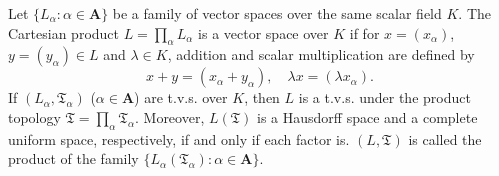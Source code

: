 Let $\{L_\alpha : \alpha \in \mathbf{A}\}$ be a family of vector spaces over the same scalar field $K$. The Cartesian product $L = \prod_\alpha L_\alpha$ is a vector space over $K$ if for $x = (x_\alpha)$, $y = (y_\alpha) \in L$ and $\lambda \in K$, addition and scalar multiplication are defined by
$$x + y = (x_\alpha + y_\alpha), \quad \lambda x = (\lambda x_\alpha).$$
If $(L_\alpha, \mathfrak{T}_\alpha)$ ($\alpha \in \mathbf{A}$) are t.v.s. over $K$, then $L$ is a t.v.s. under the product topology $\mathfrak{T} = \prod_\alpha \mathfrak{T}_\alpha$. Moreover, $L(\mathfrak{T})$ is a Hausdorff space and a complete uniform space, respectively, if and only if each factor is. $(L, \mathfrak{T})$ is called the product of the family $\{L_\alpha(\mathfrak{T}_\alpha) : \alpha \in \mathbf{A}\}$.
